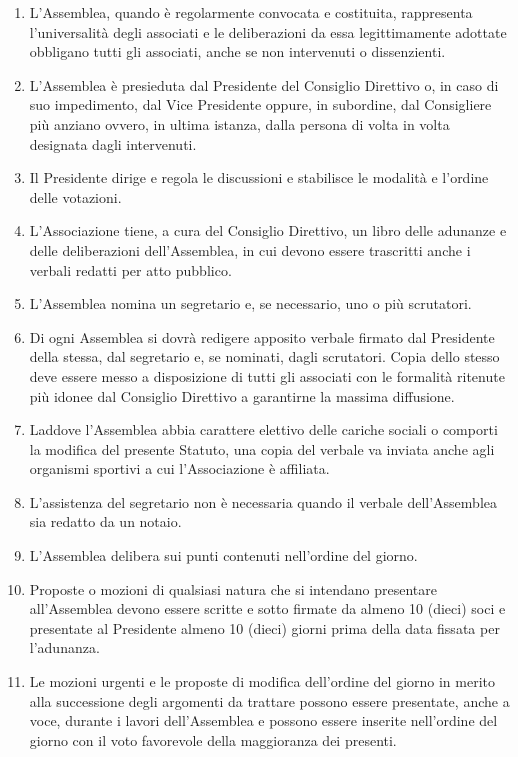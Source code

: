 \documentclass{djtsasddoc}
\begin{document}
\begin{enumerate}
		\item L'Assemblea, quando è regolarmente convocata e costituita, rappresenta l'universalità degli associati e le deliberazioni da essa legittimamente adottate obbligano tutti gli associati, anche se non intervenuti o dissenzienti.
		\item L'Assemblea è presieduta dal Presidente del Consiglio Direttivo o, in caso di suo impedimento, dal Vice Presidente oppure, in subordine, dal Consigliere più anziano ovvero, in ultima istanza, dalla persona di volta in volta designata dagli intervenuti.
		\item Il Presidente dirige e regola le discussioni e stabilisce le modalità e l'ordine delle votazioni.
		\item L'Associazione tiene, a cura del Consiglio Direttivo, un libro delle adunanze e delle deliberazioni dell'Assemblea, in cui devono essere trascritti anche i verbali redatti per atto pubblico.
		\item L'Assemblea nomina un segretario e, se necessario, uno o più scrutatori.
		\item Di ogni Assemblea si dovrà redigere apposito verbale firmato dal Presidente della stessa, dal segretario e, se nominati, dagli scrutatori. Copia dello stesso deve essere messo a disposizione di tutti gli associati con le formalità ritenute più idonee dal Consiglio Direttivo a garantirne la massima diffusione.
		\item Laddove l'Assemblea abbia carattere elettivo delle cariche sociali o comporti la modifica del presente Statuto, una copia del verbale va inviata anche agli organismi sportivi a cui l'Associazione è affiliata.
		\item L'assistenza del segretario non è necessaria quando il verbale dell'Assemblea sia redatto da un notaio.
		\item L'Assemblea delibera sui punti contenuti nell'ordine del giorno.
		\item Proposte o mozioni di qualsiasi natura che si intendano presentare all'Assemblea devono essere scritte e sotto firmate da almeno 10 (dieci) soci e presentate al Presidente almeno 10 (dieci) giorni prima della data fissata per l'adunanza.
		\item Le mozioni urgenti e le proposte di modifica dell'ordine del giorno in merito alla successione degli argomenti da trattare possono essere presentate, anche a voce, durante i lavori dell'Assemblea e possono essere inserite nell'ordine del giorno con il voto favorevole della maggioranza dei presenti.
	\end{enumerate}
	
\end{document}

